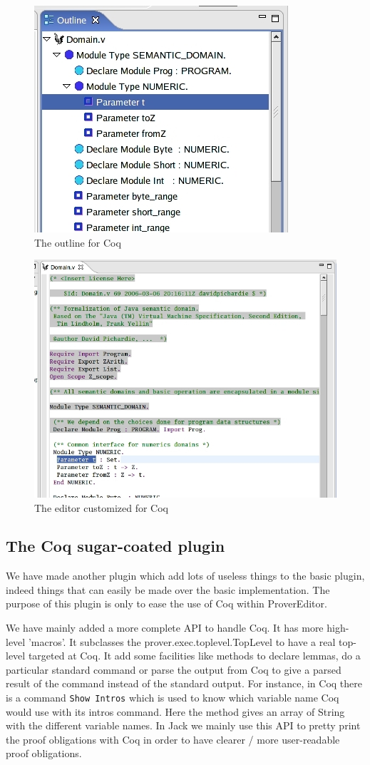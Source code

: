 \documentclass{entcs}
\begin{document}
\begin{figure}
\begin{center}
\includegraphics[width=0.5\linewidth]{coqoutline}
\end{center}
  \caption{The outline for Coq}
  \label{outline}
\end{figure}
\begin{figure}
\begin{center}
\includegraphics[width=0.6\linewidth]{coqeditor}
\end{center}
  \caption{The editor customized for Coq}
  \label{editor}
\end{figure}

\subsection{The Coq sugar-coated plugin}
\label{subsec:coq-sugar-coated}

We have made another plugin which add lots of useless things to the 
basic plugin,
indeed things that can easily be made over the basic implementation.
The purpose of this plugin is only to ease the use of Coq within ProverEditor.

We have mainly added a more complete API to handle Coq. 
It has more high-level 'macros'. 
It subclasses the prover.exec.toplevel.TopLevel to have a real top-level
targeted at Coq. It add some facilities like methods to declare lemmas, 
do a particular standard command or parse the output from Coq to give 
a parsed result of the command instead of the standard output. 
For instance, in Coq there is a command {\tt Show Intros} which
is used to know which variable name Coq would use with its  intros command. 
Here the method gives an array of String with the different variable names.
In Jack we mainly use this API to pretty print the proof obligations with 
Coq in order to have clearer / more user-readable proof obligations.
\end{document}
